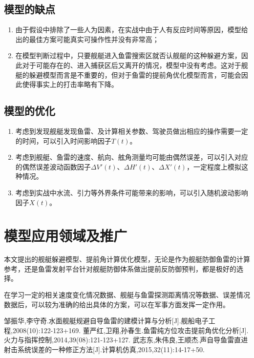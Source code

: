 \documentclass[12pt]{article}%
\begin{document}
\subsection{模型的缺点}
\begin{enumerate}[1.]\addtolength{\itemsep}{-1.5ex}
\item 由于假设中排除了一些人为因素，在实战中由于人有反应时间等原因，模型给出的最佳方案可能真实可操作性并没有非常高；
\item 在模型判断过程中，只要舰艇进入鱼雷搜索区就否认舰艇的这种躲避方案，因此对于可能存在的、进入捕获区后又离开的情况，模型中没有考虑。这对于舰艇的躲避模型而言是不重要的，但对于鱼雷的提前角优化模型而言，可能会因此使得事实上的打击率略有下降。
\end{enumerate}
\subsection{模型的优化}
\begin{enumerate}[1.]\addtolength{\itemsep}{-1.5ex}
\item 考虑到发现舰艇发现鱼雷、及计算相关参数、驾驶员做出相应的操作需要一定的时间，可以引入时间影响因子$T(t)$。
\item 考虑到舰艇、鱼雷的速度、航向、舷角测量均可能由偶然误差，可以引入对应的偶然误差波动函数因子$\Delta V'(t)$、$\Delta H'(t)$、$\Delta X'(t)$，一定程度上模拟这种情况。
\item 考虑到实战中水流、引力等外界条件可能带来的影响，可以引入随机波动影响因子$X(t)$。
\end{enumerate}
\section{模型应用领域及推广}
本文提出的舰艇躲避模型、提前角计算优化模型，无论是作为舰艇防御鱼雷的计算参考，还是鱼雷发射平台针对舰艇防御体系做出提前反防御预判，都是极好的选择。

在学习一定的相关速度变化情况数据、舰艇与鱼雷探测距离情况等数据、误差情况数据后，可以较为准确的给出具体的方案，可以在军事方面发挥一定作用。
\begin{thebibliography}{15}\addtolength{\itemsep}{-2.5ex}
邹振华,李守奇.水面舰艇规避自导鱼雷的建模计算与分析[J].舰船电子工程,2008(10):122-123+169.
 董严红,卫翔,孙春生.鱼雷纯方位攻击提前角优化分析[J].火力与指挥控制,2014,39(08):121-123+127.
 武志东,朱伟良,王顺杰.声自导鱼雷直进射击系统误差的一种修正方法[J].计算机仿真,2015,32(11):14-17+50.
\end{thebibliography}
\appendix
{}
\end{document}
